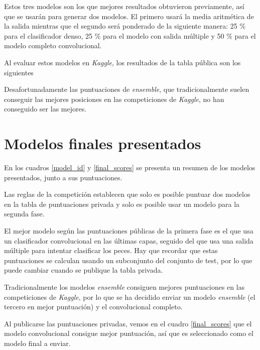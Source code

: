 Estos tres modelos son los que mejores resultados obtuvieron previamente, así
que se usarán para generar dos modelos. El primero usará la media aritmética de
la salida mientras que el segundo será ponderado de la siguiente manera: 25 \%
para el clasificador denso, 25 \% para el modelo con salida múltiple y 50 \%
para el modelo completo convolucional.

Al evaluar estos modelos en \textit{Kaggle}, los resultados de la tabla pública
son los siguientes

\begin{itemize}
    \item{Media aritmética sobre los tres modelos: \textbf{0.9175}
    \item{Media ponderada favoreciendo el modelo completo convolucional: \textbf{0.8975}
\end{itemize}

Desafortunadamente las puntuaciones de \textit{ensemble}, que tradicionalmente suelen conseguir las mejores posiciones en las competiciones de \textit{Kaggle}, no han conseguido ser las mejores.

\section{Modelos finales presentados}

En los cuadros \ref{model_id} y \ref{final_scores} se presenta un resumen de
los modelos presentados, junto a sus puntuaciones.

Las reglas de la competición establecen que solo es posible puntuar dos modelos
en la tabla de puntuaciones privada y solo es posible usar un modelo para la
segunda fase.

El mejor modelo según las puntuaciones públicas de la primera fase es el que
usa un clasificador convolucional en las últimas capas, seguido del que usa una
salida múltiple para intentar clasificar los peces. Hay que recordar que estas
puntuaciones se calculan usando un subconjunto del conjunto de test, por lo que
puede cambiar cuando se publique la tabla privada.

Tradicionalmente los modelos \textit{ensemble} consiguen mejores puntuaciones
en las competiciones de \textit{Kaggle}, por lo que se ha decidido enviar un
modelo \textit{ensemble} (el tercero en mejor puntuación) y el convolucional
completo.

Al publicarse las puntuaciones privadas, vemos en el cuadro \ref{final_scores}
que el modelo convolucional consigue mejor puntuación, así que es seleccionado
como el modelo final a enviar.

